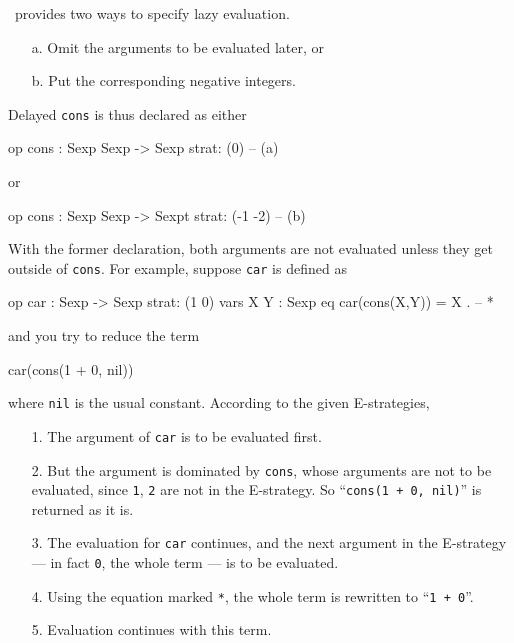\documentclass[a4paper]{memoir}
\begin{document}
\cafeobj~provides two ways to specify lazy evaluation.
\begin{itemize}
\item[a.] Omit the arguments to be evaluated later, or
\item[b.] Put the corresponding negative integers.
\end{itemize}
Delayed \verb|cons| is thus declared as either
\begin{vvtm}
\begin{ccode}
  op cons : Sexp Sexp -> Sexp { strat: (0) } -- (a)
\end{ccode}
\end{vvtm}
or
\begin{vvtm}
\begin{ccode}
  op cons : Sexp Sexp -> Sexpt { strat: (-1 -2) } -- (b)
\end{ccode}
\end{vvtm}
With the former declaration, both arguments are not evaluated unless
they get outside of \verb|cons|. For example, suppose
\verb|car| is defined as
\begin{vvtm}
\begin{ccode}
  op car : Sexp -> Sexp { strat: (1 0) }
  vars X Y : Sexp
  eq car(cons(X,Y)) = X . -- *
\end{ccode}
\end{vvtm}
and you try to reduce the term
\begin{vvtm}
\begin{ccode}
  car(cons(1 + 0, nil))
\end{ccode}
\end{vvtm}
where \verb|nil| is the usual constant. According to the given E-strategies,
\begin{itemize}
\item[1.] The argument of \verb|car| is to be evaluated first.
\item[2.] But the argument is dominated by \verb|cons|, whose
  arguments are not to be evaluated, since \verb|1|, \verb|2| are
  not in the E-strategy. So ``\verb|cons(1 + 0, nil)|'' is
  returned as it is.
\item[3.] The evaluation for \verb|car| continues, and the next
  argument in the E-strategy --- in fact \verb|0|, the whole term ---
  is to be evaluated.
\item[4.] Using the equation marked \verb|*|, the whole term is
  rewritten to ``\verb|1 + 0|''.
\item[5.] Evaluation continues with this term.
\end{itemize}
\end{document}
